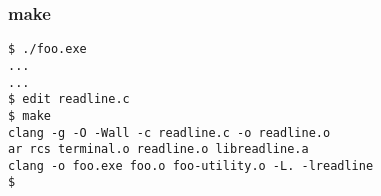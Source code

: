 \begin{frame}[fragile]\frametitle{make}
\begin{Verbatim}
$ ./foo.exe
...
...
$ edit readline.c
$ make
clang -g -O -Wall -c readline.c -o readline.o
ar rcs terminal.o readline.o libreadline.a
clang -o foo.exe foo.o foo-utility.o -L. -lreadline
$ 
\end{Verbatim}
\end{frame}
